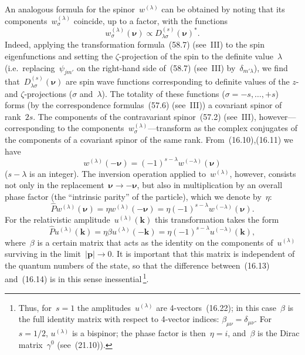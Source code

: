 An analogous formula for the spinor~$w^{(\lambda)}$ can be obtained by noting that its components~$w^{(\lambda)}_\sigma$ coincide, up to a
factor, with the functions
\begin{equation}
w^{(\lambda)}_\sigma(\boldsymbol{\nu}) \propto D^{(s)}_{\lambda\sigma}(\boldsymbol{\nu})^*.
\tag{16.11}
\end{equation}
Indeed, applying the transformation formula~(58.7) (see~III) to the spin eigenfunctions and setting the $\zeta$-projection of the spin to the definite value~$\lambda$ (i.e.\ replacing~$\psi_{jm'}$ on the right-hand side of~(58.7) (see~III) by~$\delta_{m'\lambda}$), we find that~$D^{(s)}_{\lambda\sigma}(\boldsymbol{\nu})$ are spin wave functions corresponding to definite values of the $z$- and $\zeta$-projections ($\sigma$ and~$\lambda$). The totality of these functions ($\sigma = -s, \ldots, +s$) forms (by the correspondence formulas~(57.6) (see~III)) a covariant spinor of rank~$2s$. The components of the contravariant spinor~(57.2) (see~III), however---corresponding to the components~$w^{(\lambda)}_\sigma$---transform as the complex conjugates of the components of a covariant spinor of the same rank. From~(16.10),(16.11) we have
\begin{equation}
w^{(\lambda)}(-\boldsymbol{\nu}) = (-1)^{s-\lambda}w^{(-\lambda)}(\boldsymbol{\nu})
\tag{16.12}
\end{equation}
($s - \lambda$ is an integer). The inversion operation applied to~$w^{(\lambda)}$, however, consists not only in the replacement~$\boldsymbol{\nu} \to -\boldsymbol{\nu}$, but also in multiplication by an overall phase factor (the ``intrinsic parity'' of the particle), which we denote by~$\eta$:
\begin{equation}
\hat{P}w^{(\lambda)}(\boldsymbol{\nu}) = \eta w^{(\lambda)}(-\boldsymbol{\nu}) = \eta(-1)^{s-\lambda}w^{(-\lambda)}(\boldsymbol{\nu}).
\tag{16.13}
\end{equation}
For the relativistic amplitude~$u^{(\lambda)}(\mathbf{k})$ this transformation takes the form
\begin{equation}
\hat{P}u^{(\lambda)}(\mathbf{k}) = \eta\beta u^{(\lambda)}(-\mathbf{k}) = \eta(-1)^{s-\lambda}u^{(-\lambda)}(\mathbf{k}),
\tag{16.14}
\end{equation}
where~$\beta$ is a certain matrix that acts as the identity on the components of~$u^{(\lambda)}$ surviving in the limit~$|\mathbf{p}| \to 0$. It is important that this matrix is independent of the quantum numbers of the state, so that the difference between~(16.13) and~(16.14) is in this sense inessential\,\footnote{Thus, for~$s = 1$ the amplitudes~$u^{(\lambda)}$ are 4-vectors~(16.22); in this case~$\beta$ is the full identity matrix with respect to 4-vector indices: $\beta_{\mu\nu} = \delta_{\mu\nu}$. For~$s = 1/2$, $u^{(\lambda)}$ is a bispinor; the phase factor is then~$\eta = i$, and~$\beta$ is the Dirac matrix~$\gamma^0$ (see~(21.10)).}.

